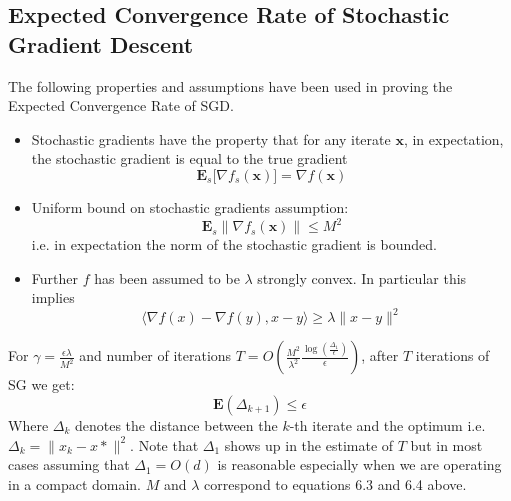 \documentclass[12pt]{report}
\begin{document}
\subsection{Expected Convergence Rate of Stochastic Gradient Descent}
The following properties and assumptions have been used in proving the Expected Convergence Rate of SGD.
\begin{itemize}
    \item Stochastic gradients have the property that for any iterate $\mathbf{x}$, in expectation, the stochastic gradient is equal to the true gradient 
    \begin{equation}
    \mathbf{E}_{s}\lbrack \nabla f_{s}(\mathbf{x}) \rbrack = \nabla f(\mathbf{x})
    \end{equation}
    
    
    \item Uniform bound on stochastic gradients assumption:
    \begin{equation}
    \mathbf{E}_{s}\|\nabla f_{s}(\mathbf{x})\|\leq M^{2}
    \end{equation}
     i.e. in expectation the norm of the stochastic gradient is bounded. 
    
    \item Further $f$ has been assumed to be $\lambda$ strongly convex. In particular this implies 
    \begin{equation}
    \langle \nabla f(x) - \nabla f(y), x-y \rangle \geq \lambda \|x-y\|^{2}
    \end{equation}
\end{itemize}

\begin{theorem}
\label{ThmNeat}
For $\gamma = \frac{\epsilon \lambda}{M^2}$ and number of iterations $T= O(\frac{M^2}{\lambda^2}\frac{\log(\frac{\Delta_{1}}{\epsilon})}{\epsilon})$, after $T$ iterations of SG we get:
\begin{equation}
\mathbf{E}(\Delta_{k+1}) \leq \epsilon
\end{equation}
Where $\Delta_{k}$ denotes the distance between the $k$-th iterate and the optimum i.e. $\Delta_{k} = \|x_{k}-x*\|^{2}$. Note that $\Delta_{1}$ shows up in the estimate of $T$ but in most cases assuming that $\Delta_{1} = O(d)$ is reasonable especially when we are operating in a compact domain. $M$ and $\lambda$ correspond to equations 6.3 and 6.4 above.  
\end{theorem}
\end{document}
